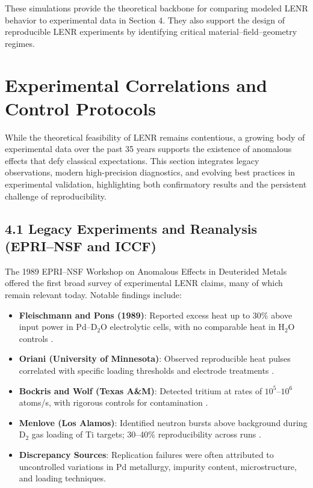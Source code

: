     These simulations provide the theoretical backbone for comparing modeled LENR behavior to experimental data in Section 4. They also support the design of reproducible LENR experiments by identifying critical material–field–geometry regimes.
    
    \section{Experimental Correlations and Control Protocols}
    
    While the theoretical feasibility of LENR remains contentious, a growing body of experimental data over the past 35 years supports the existence of anomalous effects that defy classical expectations. This section integrates legacy observations, modern high-precision diagnostics, and evolving best practices in experimental validation, highlighting both confirmatory results and the persistent challenge of reproducibility.
    
    \subsection{4.1 Legacy Experiments and Reanalysis (EPRI–NSF and ICCF)}
    
    The 1989 EPRI–NSF Workshop on Anomalous Effects in Deuterided Metals offered the first broad survey of experimental LENR claims, many of which remain relevant today. Notable findings include:
    
    \begin{itemize}
        \item \textbf{Fleischmann and Pons (1989)}: Reported excess heat up to 30\% above input power in Pd–D$_2$O electrolytic cells, with no comparable heat in H$_2$O controls \cite{fleischmann1989}.
        
        \item \textbf{Oriani (University of Minnesota)}: Observed reproducible heat pulses correlated with specific loading thresholds and electrode treatments \cite{oriani1990}.
        
        \item \textbf{Bockris and Wolf (Texas A\&M)}: Detected tritium at rates of $10^5$–$10^6$ atoms/s, with rigorous controls for contamination \cite{bockris1991, wolf1990}.
        
        \item \textbf{Menlove (Los Alamos)}: Identified neutron bursts above background during D$_2$ gas loading of Ti targets; 30–40\% reproducibility across runs \cite{menlove1989}.
        
        \item \textbf{Discrepancy Sources}: Replication failures were often attributed to uncontrolled variations in Pd metallurgy, impurity content, microstructure, and loading techniques.
    \end{itemize}
    
